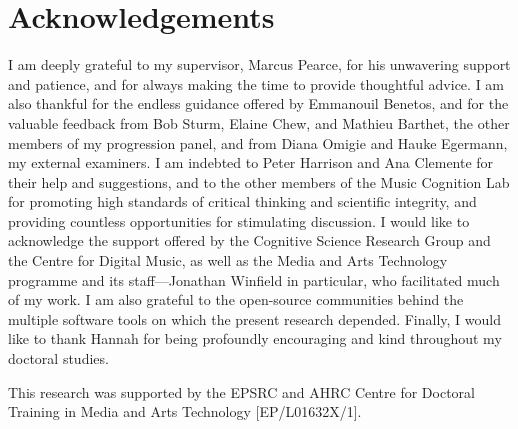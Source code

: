 
\chapter*{Acknowledgements}

I am deeply grateful to my supervisor, Marcus Pearce, for his unwavering support and patience, and for always making the time to provide thoughtful advice. I am also thankful for the endless guidance offered by Emmanouil Benetos, and for the valuable feedback from Bob Sturm, Elaine Chew, and Mathieu Barthet, the other members of my progression panel, and from Diana Omigie and Hauke Egermann, my external examiners. I am indebted to Peter Harrison and Ana Clemente for their help and suggestions, and to the other members of the Music Cognition Lab for promoting high standards of critical thinking and scientific integrity, and providing countless opportunities for stimulating discussion. I would like to acknowledge the support offered by the Cognitive Science Research Group and the Centre for Digital Music, as well as the Media and Arts Technology programme and its staff---Jonathan Winfield in particular, who facilitated much of my work. I am also grateful to the open-source communities behind the multiple software tools on which the present research depended. Finally, I would like to thank Hannah for being profoundly encouraging and kind throughout my doctoral studies.

This research was supported by the EPSRC and AHRC Centre for Doctoral Training in Media and Arts Technology [EP/L01632X/1].